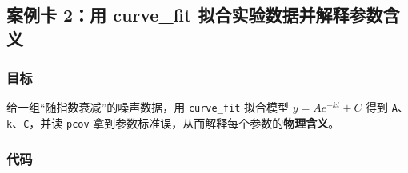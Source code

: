 \begin{Shaded}
\begin{Highlighting}[]
\OperatorTok{=}\OperatorTok{=}\NormalTok{[}\NormalTok{, }\NormalTok{, }\NormalTok{])}
\OperatorTok{=}
\NormalTok{(}\NormalTok{))}
\NormalTok{(}\NormalTok{))}
\end{Highlighting}
\end{Shaded}

\begin{Shaded}
\begin{Highlighting}[]
\end{Highlighting}
\end{Shaded}

\subsection{案例卡 2：用 curve\_fit
拟合实验数据并解释参数含义}\label{ux6848ux4f8bux5361-2ux7528-curve_fit-ux62dfux5408ux5b9eux9a8cux6570ux636eux5e76ux89e3ux91caux53c2ux6570ux542bux4e49}

\subsubsection{目标}\label{ux76eeux6807-15}

给一组``随指数衰减''的噪声数据，用 \texttt{curve\_fit} 拟合模型
\(y=A e^{-k t}+C\) 得到 \texttt{A}、\texttt{k}、\texttt{C}，并读
\texttt{pcov} 拿到参数标准误，从而解释每个参数的\textbf{物理含义}。

\subsubsection{代码}\label{ux4ee3ux7801-17}

